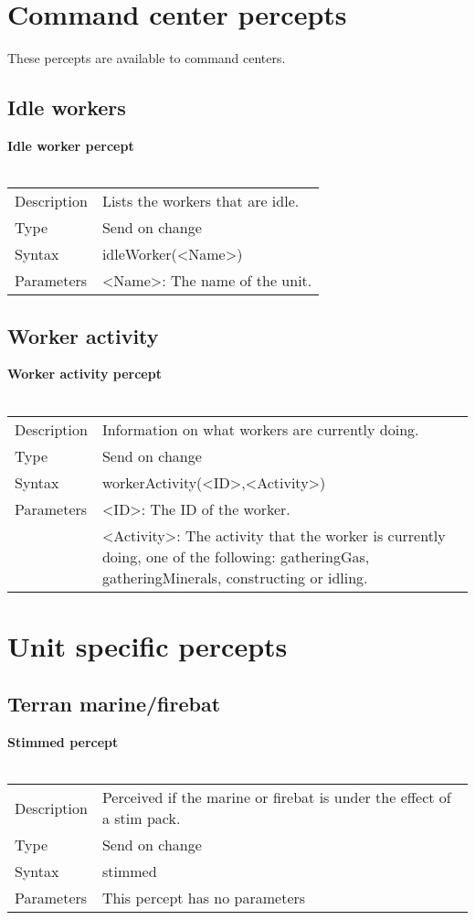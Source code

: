\documentclass[english,11pt]{report}
\begin{document}
\newpage
\section{Command center percepts}
These percepts are available to command centers.
\subsection{Idle workers}
\textbf{Idle worker percept}\\
\\
\begin{tabularx}{\textwidth}{lX}
 Description & Lists the workers that are idle. \\
 Type & Send on change \\
 Syntax & idleWorker(<Name>) \\
 Parameters &   <Name>: The name of the unit.
\end{tabularx}

\subsection{Worker activity}
\textbf{Worker activity percept}\\
\\
\begin{tabularx}{\textwidth}{lX}
 Description & Information on what workers are currently doing. \\
 Type & Send on change \\
 Syntax & workerActivity(<ID>,<Activity>) \\
 Parameters &   <ID>: The ID of the worker.\\
            &   <Activity>: The activity that the worker is currently doing, one of the following: gatheringGas, gatheringMinerals, constructing or idling.
\end{tabularx}

\newpage
\section{Unit specific percepts}
\subsection{Terran marine/firebat}
\textbf{Stimmed percept}\\
\\
\begin{tabularx}{\textwidth}{lX}
 Description & Perceived if the marine or firebat is under the effect of a stim pack. \\
 Type & Send on change \\
 Syntax & stimmed \\
 Parameters &   This percept has no parameters
\end{tabularx}\\
\\
\\
\end{document}
